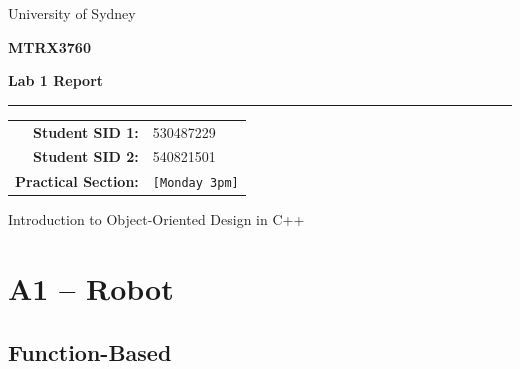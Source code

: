 \documentclass[10pt,a4paper]{article}
\begin{document}
\begin{titlepage}
    \centering

    \vspace*{2.2cm}

    {\Large University of Sydney\par}

    \vspace{1cm}

    {\LARGE\bfseries MTRX3760\par}

    \vspace{0.3cm}

    {\Huge\bfseries Lab 1 Report\par}

    \vspace{1.5cm}

    \rule{0.75\textwidth}{0.5pt}

    \vspace{1.5cm}

    \begin{tabular}{rl}
        \textbf{Student SID 1:} & 530487229 \\[0.4cm]
        \textbf{Student SID 2:} & 540821501 \\[0.4cm]
        \textbf{Practical Section: } & \texttt{[Monday 3pm]} \\[0.4cm]
    \end{tabular}

    \vfill

    {\large Introduction to Object-Oriented Design in C++}

    \vspace{1cm}

\end{titlepage}

\tableofcontents
\newpage

\section{A1 -- Robot}

\subsection{Function-Based}
\end{document}
